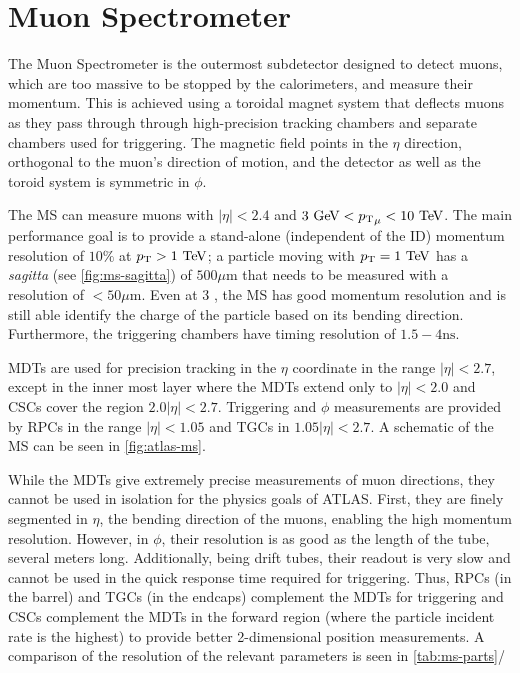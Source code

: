 \section{Muon Spectrometer}
The Muon Spectrometer is the outermost subdetector designed to detect muons, which are too massive to be stopped by the calorimeters, and measure their momentum. This is achieved using a toroidal magnet system that deflects muons as they pass through through  high-precision tracking chambers and separate chambers used for triggering. The magnetic field points in the $\eta$ direction, orthogonal to the muon's direction of motion, and the detector as well as the toroid system is symmetric in $\phi$.

The \ac{MS} can measure muons with $|\eta| < 2.4$ and $3 \GeV < {\pt}_{\mu} < 10 \TeV$. The main performance goal is to provide a stand-alone (independent of the \ac{ID}) momentum resolution of $10\%$ at $\pT > 1 \TeV$; a particle moving with $\pt = 1 \TeV$ has a \emph{sagitta} (see \autoref{fig:ms-sagitta}) of $500\mu\textrm{m}$ that needs to be measured with a resolution of $<50\mu\textrm{m}$. Even at 3 \TeV, the \ac{MS} has good momentum resolution and is still able identify the charge of the particle based on its bending direction. Furthermore, the triggering chambers have timing resolution of $1.5-4 \textrm{ns}$.  

\ac{MDT}s are used for precision tracking in the $\eta$ coordinate in the range $|\eta| < 2.7$, except in the inner most layer where the \ac{MDT}s extend only to $|\eta| < 2.0$ and \ac{CSC}s cover the region $2.0|\eta| < 2.7$. Triggering and $\phi$ measurements are provided by \ac{RPC}s in the range $|\eta| < 1.05$ and \ac{TGC}s in $1.05 |\eta| < 2.7$. A schematic of the \ac{MS} can be seen in \autoref{fig:atlas-ms}.  


While the \ac{MDT}s give extremely precise measurements of muon directions, they cannot be used in isolation for the physics goals of \ac{ATLAS}. First, they are finely segmented in $\eta$, the bending direction of the muons, enabling the high momentum resolution. However, in $\phi$, their resolution is as good as the length of the tube, several meters long. Additionally, being drift tubes, their readout is very slow and cannot be used in the quick response time required for triggering. Thus, \ac{RPC}s (in the barrel) and \ac{TGC}s (in the endcaps) complement the \ac{MDT}s for triggering and \ac{CSC}s complement the \ac{MDT}s in the forward region (where the particle incident rate is the highest) to provide better 2-dimensional position measurements. A comparison of the resolution of the relevant parameters is seen in \autoref{tab:ms-parts}/

